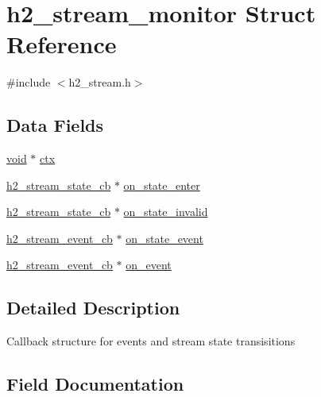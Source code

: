 \hypertarget{structh2__stream__monitor}{}\section{h2\+\_\+stream\+\_\+monitor Struct Reference}
\label{structh2__stream__monitor}


{\ttfamily \#include $<$h2\+\_\+stream.\+h$>$}

\subsection*{Data Fields}
\begin{DoxyCompactItemize}
\item 
\hyperlink{group__MOD__ISAPI_gacd6cdbf73df3d9eed42fa493d9b621a6}{void} $\ast$ \hyperlink{structh2__stream__monitor_ad1f09e8bb43bf668dd23868d5af26b68}{ctx}
\item 
\hyperlink{h2__stream_8h_af296ece903a1d57cc5490f162babebfc}{h2\+\_\+stream\+\_\+state\+\_\+cb} $\ast$ \hyperlink{structh2__stream__monitor_a0c90be76160ebd6d2494a2b21ae7da4f}{on\+\_\+state\+\_\+enter}
\item 
\hyperlink{h2__stream_8h_af296ece903a1d57cc5490f162babebfc}{h2\+\_\+stream\+\_\+state\+\_\+cb} $\ast$ \hyperlink{structh2__stream__monitor_a9cd34db7bbe3e81dd763af85a3a537b8}{on\+\_\+state\+\_\+invalid}
\item 
\hyperlink{h2__stream_8h_a6f6aec0c178699c934f6c3db6f192ac4}{h2\+\_\+stream\+\_\+event\+\_\+cb} $\ast$ \hyperlink{structh2__stream__monitor_a26fb918d8b495eed99491c86624252d1}{on\+\_\+state\+\_\+event}
\item 
\hyperlink{h2__stream_8h_a6f6aec0c178699c934f6c3db6f192ac4}{h2\+\_\+stream\+\_\+event\+\_\+cb} $\ast$ \hyperlink{structh2__stream__monitor_a9a4c49e17c6b18b5f600ff224f365771}{on\+\_\+event}
\end{DoxyCompactItemize}


\subsection{Detailed Description}
Callback structure for events and stream state transisitions 

\subsection{Field Documentation}
